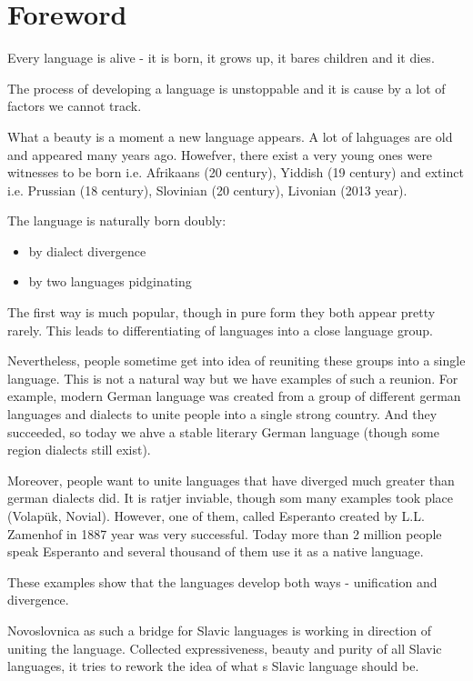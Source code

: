 \chapter{Foreword}

Every language is alive - it is born, it grows up, it bares children and it dies.

The process of developing a language is unstoppable and it is cause by a lot of factors we cannot track.

What a beauty is a moment a new language appears. A lot of lahguages are old and appeared many years ago. Howefver, there exist a very young ones were witnesses to be born i.e. Afrikaans (20 century), Yiddish (19 century) and extinct i.e. Prussian (18 century), Slovinian (20 century), Livonian (2013 year).

The language is naturally born doubly:

\begin{itemize}
	\item by dialect divergence
	\item by two languages pidginating 
\end{itemize}

The first way is much popular, though in pure form they both appear pretty rarely. This leads to differentiating of languages into a close language group.

Nevertheless, people sometime get into idea of reuniting these groups into a single language. This is not a natural way but we have examples of such a reunion. For example, modern German language was created from a group of different german languages and dialects to unite people into a single strong country. And they succeeded, so today we ahve a stable literary German language (though some region dialects still exist).

Moreover, people want to unite languages that have diverged much greater than german dialects did. It is ratjer inviable, though som many examples took place (Volapük, Novial). However, one of them, called Esperanto created by L.L. Zamenhof in 1887 year was very successful. Today more than 2 million people speak Esperanto and several thousand of them use it as a native language.

These examples show that the languages develop both ways - unification and divergence.

Novoslovnica as such a bridge for Slavic languages is working in direction of uniting the language. Collected expressiveness, beauty and purity of all Slavic languages, it tries to rework the idea of what s Slavic language should be.

